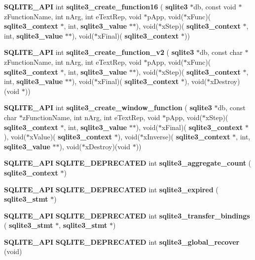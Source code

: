 \begin{DoxyCompactItemize}
\item 
\textbf{ S\+Q\+L\+I\+T\+E\+\_\+\+A\+PI} int \textbf{ sqlite3\+\_\+create\+\_\+function16} (\textbf{ sqlite3} $\ast$db, const void $\ast$z\+Function\+Name, int n\+Arg, int e\+Text\+Rep, void $\ast$p\+App, void($\ast$x\+Func)(\textbf{ sqlite3\+\_\+context} $\ast$, int, \textbf{ sqlite3\+\_\+value} $\ast$$\ast$), void($\ast$x\+Step)(\textbf{ sqlite3\+\_\+context} $\ast$, int, \textbf{ sqlite3\+\_\+value} $\ast$$\ast$), void($\ast$x\+Final)(\textbf{ sqlite3\+\_\+context} $\ast$))
\item 
\textbf{ S\+Q\+L\+I\+T\+E\+\_\+\+A\+PI} int \textbf{ sqlite3\+\_\+create\+\_\+function\+\_\+v2} (\textbf{ sqlite3} $\ast$db, const char $\ast$z\+Function\+Name, int n\+Arg, int e\+Text\+Rep, void $\ast$p\+App, void($\ast$x\+Func)(\textbf{ sqlite3\+\_\+context} $\ast$, int, \textbf{ sqlite3\+\_\+value} $\ast$$\ast$), void($\ast$x\+Step)(\textbf{ sqlite3\+\_\+context} $\ast$, int, \textbf{ sqlite3\+\_\+value} $\ast$$\ast$), void($\ast$x\+Final)(\textbf{ sqlite3\+\_\+context} $\ast$), void($\ast$x\+Destroy)(void $\ast$))
\item 
\textbf{ S\+Q\+L\+I\+T\+E\+\_\+\+A\+PI} int \textbf{ sqlite3\+\_\+create\+\_\+window\+\_\+function} (\textbf{ sqlite3} $\ast$db, const char $\ast$z\+Function\+Name, int n\+Arg, int e\+Text\+Rep, void $\ast$p\+App, void($\ast$x\+Step)(\textbf{ sqlite3\+\_\+context} $\ast$, int, \textbf{ sqlite3\+\_\+value} $\ast$$\ast$), void($\ast$x\+Final)(\textbf{ sqlite3\+\_\+context} $\ast$), void($\ast$x\+Value)(\textbf{ sqlite3\+\_\+context} $\ast$), void($\ast$x\+Inverse)(\textbf{ sqlite3\+\_\+context} $\ast$, int, \textbf{ sqlite3\+\_\+value} $\ast$$\ast$), void($\ast$x\+Destroy)(void $\ast$))
\item 
\textbf{ S\+Q\+L\+I\+T\+E\+\_\+\+A\+PI} \textbf{ S\+Q\+L\+I\+T\+E\+\_\+\+D\+E\+P\+R\+E\+C\+A\+T\+ED} int \textbf{ sqlite3\+\_\+aggregate\+\_\+count} (\textbf{ sqlite3\+\_\+context} $\ast$)
\item 
\textbf{ S\+Q\+L\+I\+T\+E\+\_\+\+A\+PI} \textbf{ S\+Q\+L\+I\+T\+E\+\_\+\+D\+E\+P\+R\+E\+C\+A\+T\+ED} int \textbf{ sqlite3\+\_\+expired} (\textbf{ sqlite3\+\_\+stmt} $\ast$)
\item 
\textbf{ S\+Q\+L\+I\+T\+E\+\_\+\+A\+PI} \textbf{ S\+Q\+L\+I\+T\+E\+\_\+\+D\+E\+P\+R\+E\+C\+A\+T\+ED} int \textbf{ sqlite3\+\_\+transfer\+\_\+bindings} (\textbf{ sqlite3\+\_\+stmt} $\ast$, \textbf{ sqlite3\+\_\+stmt} $\ast$)
\item 
\textbf{ S\+Q\+L\+I\+T\+E\+\_\+\+A\+PI} \textbf{ S\+Q\+L\+I\+T\+E\+\_\+\+D\+E\+P\+R\+E\+C\+A\+T\+ED} int \textbf{ sqlite3\+\_\+global\+\_\+recover} (void)

\end{DoxyCompactItemize}

